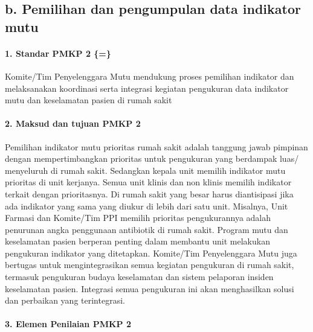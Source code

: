 \documentclass[
]{book}
\begin{document}
\hypertarget{b.-pemilihan-dan-pengumpulan-data-indikator-mutu}{%
\subsection*{b. Pemilihan dan pengumpulan data indikator mutu}\label{b.-pemilihan-dan-pengumpulan-data-indikator-mutu}}

\hypertarget{standar-pmkp-2}{%
\paragraph{1. Standar PMKP 2 \{=\}}\label{standar-pmkp-2}}

Komite/Tim Penyelenggara Mutu mendukung proses pemilihan indikator dan melaksanakan koordinasi serta integrasi kegiatan pengukuran data indikator mutu dan keselamatan pasien di rumah sakit

\hypertarget{maksud-dan-tujuan-pmkp-2}{%
\paragraph*{2. Maksud dan tujuan PMKP 2}\label{maksud-dan-tujuan-pmkp-2}}

Pemilihan indikator mutu prioritas rumah sakit adalah tanggung jawab pimpinan dengan mempertimbangkan prioritas untuk pengukuran yang berdampak luas/ menyeluruh di rumah sakit. Sedangkan kepala unit memilih indikator mutu prioritas di unit kerjanya. Semua unit klinis dan non klinis memilih indikator terkait dengan prioritasnya. Di rumah sakit yang besar harus diantisipasi jika ada indikator yang sama yang diukur di lebih dari satu unit. Misalnya, Unit Farmasi dan Komite/Tim PPI memilih prioritas pengukurannya adalah penurunan angka penggunaan antibiotik di rumah sakit. Program mutu dan keselamatan pasien berperan penting dalam membantu unit melakukan pengukuran indikator yang ditetapkan. Komite/Tim Penyelenggara Mutu juga bertugas untuk mengintegrasikan semua kegiatan pengukuran di rumah sakit, termasuk pengukuran budaya keselamatan dan sistem pelaporan insiden keselamatan pasien. Integrasi semua pengukuran ini akan menghasilkan solusi dan perbaikan yang terintegrasi.

\hypertarget{elemen-penilaian-pmkp-2}{%
\paragraph*{3. Elemen Penilaian PMKP 2}\label{elemen-penilaian-pmkp-2}}
\end{document}
